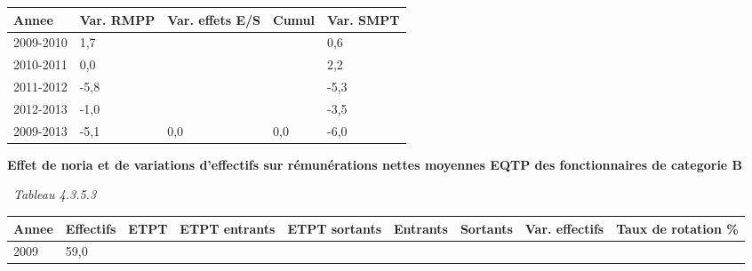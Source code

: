 \begin{longtable}[]{@{}lllll@{}}
\toprule
Annee & Var. RMPP & Var. effets E/S & Cumul & Var. SMPT\tabularnewline
\midrule
\endhead
2009-2010 & 1,7 & & & 0,6\tabularnewline
2010-2011 & 0,0 & & & 2,2\tabularnewline
2011-2012 & -5,8 & & & -5,3\tabularnewline
2012-2013 & -1,0 & & & -3,5\tabularnewline
2009-2013 & -5,1 & 0,0 & 0,0 & -6,0\tabularnewline
\bottomrule
\end{longtable}

\textbf{Effet de noria et de variations d'effectifs sur rémunérations
nettes moyennes EQTP des fonctionnaires de categorie B}

~\emph{Tableau 4.3.5.3}

\begin{longtable}[]{@{}lllllllll@{}}
\toprule
\begin{minipage}[b]{0.05\columnwidth}\raggedright
Annee\strut
\end{minipage} & \begin{minipage}[b]{0.08\columnwidth}\raggedright
Effectifs\strut
\end{minipage} & \begin{minipage}[b]{0.04\columnwidth}\raggedright
ETPT\strut
\end{minipage} & \begin{minipage}[b]{0.10\columnwidth}\raggedright
ETPT entrants\strut
\end{minipage} & \begin{minipage}[b]{0.10\columnwidth}\raggedright
ETPT sortants\strut
\end{minipage} & \begin{minipage}[b]{0.07\columnwidth}\raggedright
Entrants\strut
\end{minipage} & \begin{minipage}[b]{0.07\columnwidth}\raggedright
Sortants\strut
\end{minipage} & \begin{minipage}[b]{0.11\columnwidth}\raggedright
Var. effectifs\strut
\end{minipage} & \begin{minipage}[b]{0.14\columnwidth}\raggedright
Taux de rotation \%\strut
\end{minipage}\tabularnewline
\midrule
\endhead
\begin{minipage}[t]{0.05\columnwidth}\raggedright
2009\strut
\end{minipage} & \begin{minipage}[t]{0.08\columnwidth}\raggedright
59,0\strut
\end{minipage} & \begin{minipage}[t]{0.04\columnwidth}\raggedright

\end{minipage}
\end{longtable}
